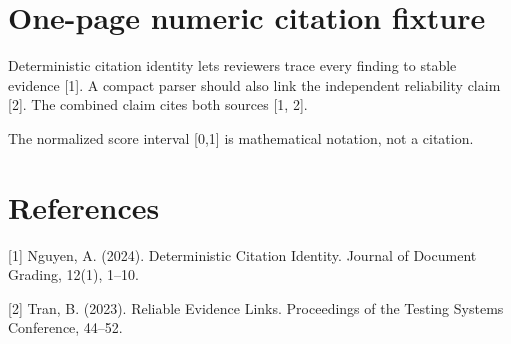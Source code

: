 \documentclass[10pt]{article}
\begin{document}
\section*{One-page numeric citation fixture}

Deterministic citation identity lets reviewers trace every finding to stable evidence [1].
A compact parser should also link the independent reliability claim [2].
The combined claim cites both sources [1, 2].

The normalized score interval [0,1] is mathematical notation, not a citation.

\section*{References}

[1] Nguyen, A. (2024). Deterministic Citation Identity. Journal of Document Grading, 12(1), 1--10.

[2] Tran, B. (2023). Reliable Evidence Links. Proceedings of the Testing Systems Conference, 44--52.
\end{document}
